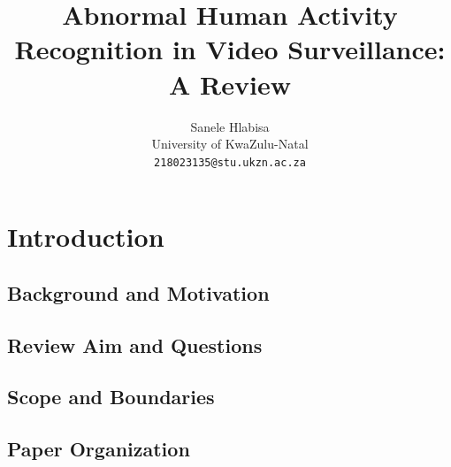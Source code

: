\documentclass[11pt,a4paper]{article}
\title{
    Abnormal Human Activity Recognition in Video Surveillance: A Review
}
\author{Sanele Hlabisa \\
University of KwaZulu-Natal \\
\texttt{218023135@stu.ukzn.ac.za}}
\date{}
\begin{document}
    \maketitle

    \begin{abstract}
    \end{abstract}


    \section{Introduction}
    \label{sec:introduction}

    \subsection{Background and Motivation}
    \label{subsec:background-motivation}

    \subsection{Review Aim and Questions}
    \label{subsec:review-aim-questions}

    \subsection{Scope and Boundaries}
    \label{subsec:scope-boundaries}

    \subsection{Paper Organization}
    \label{subsec:paper-organization}
\end{document}
